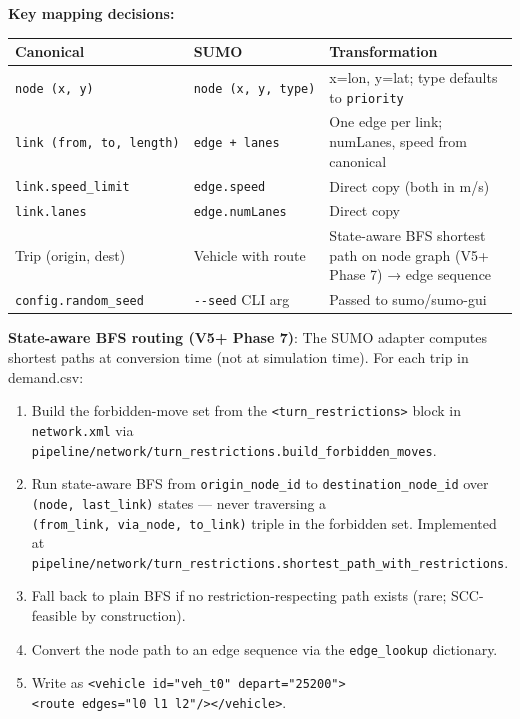 \textbf{Key mapping decisions:}

\begin{longtable}[]{@{}lll@{}}
\toprule\noalign{}
Canonical & SUMO & Transformation \\
\midrule\noalign{}
\endhead
\bottomrule\noalign{}
\endlastfoot
\texttt{node\ (x,\ y)} & \texttt{node\ (x,\ y,\ type)} & x=lon, y=lat;
type defaults to \texttt{priority} \\
\texttt{link\ (from,\ to,\ length)} & \texttt{edge\ +\ lanes} & One edge
per link; numLanes, speed from canonical \\
\texttt{link.speed\_limit} & \texttt{edge.speed} & Direct copy (both in
m/s) \\
\texttt{link.lanes} & \texttt{edge.numLanes} & Direct copy \\
Trip (origin, dest) & Vehicle with route & State-aware BFS shortest path
on node graph (V5+ Phase 7) → edge sequence \\
\texttt{config.random\_seed} & \texttt{-\/-seed} CLI arg & Passed to
sumo/sumo-gui \\
\end{longtable}

\textbf{State-aware BFS routing (V5+ Phase 7)}: The SUMO adapter
computes shortest paths at conversion time (not at simulation time). For
each trip in demand.csv:

\begin{enumerate}
\def\labelenumi{\arabic{enumi}.}
\tightlist
\item
  Build the forbidden-move set from the
  \texttt{\textless{}turn\_restrictions\textgreater{}} block in
  \texttt{network.xml} via
  \texttt{pipeline/network/turn\_restrictions.build\_forbidden\_moves}.
\item
  Run state-aware BFS from \texttt{origin\_node\_id} to
  \texttt{destination\_node\_id} over \texttt{(node,\ last\_link)}
  states --- never traversing a
  \texttt{(from\_link,\ via\_node,\ to\_link)} triple in the forbidden
  set. Implemented at
  \texttt{pipeline/network/turn\_restrictions.shortest\_path\_with\_restrictions}.
\item
  Fall back to plain BFS if no restriction-respecting path exists (rare;
  SCC-feasible by construction).
\item
  Convert the node path to an edge sequence via the
  \texttt{edge\_lookup} dictionary.
\item
  Write as
  \texttt{\textless{}vehicle\ id="veh\_t0"\ depart="25200"\textgreater{}\textless{}route\ edges="l0\ l1\ l2"/\textgreater{}\textless{}/vehicle\textgreater{}}.
\end{enumerate}

